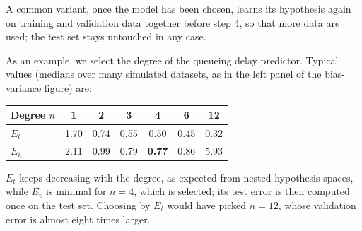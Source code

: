 \begin{center}
\end{center}

A common variant, once the model has been chosen, learns its hypothesis again on training and validation data together before step 4, so that more data are used; the test set stays untouched in any case.

As an example, we select the degree of the queueing delay predictor. Typical values (medians over many simulated datasets, as in the left panel of the bias-variance figure) are:
\begin{center}
    \begin{tabular}{l|c|c|c|c|c|c}
        \textbf{Degree $n$} & 1 & 2 & 3 & 4 & 6 & 12 \\ \hline
        $E_t$ & 1.70 & 0.74 & 0.55 & 0.50 & 0.45 & 0.32 \\
        $E_v$ & 2.11 & 0.99 & 0.79 & \textbf{0.77} & 0.86 & 5.93 \\
    \end{tabular}
\end{center}
$E_t$ keeps decreasing with the degree, as expected from nested hypothesis spaces, while $E_v$ is minimal for $n = 4$, which is selected; its test error is then computed once on the test set. Choosing by $E_t$ would have picked $n = 12$, whose validation error is almost eight times larger.

